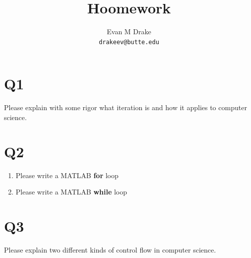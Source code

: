 \documentclass[12pt]{article}
\title{Hoomework}
\author{
	Evan M Drake \\
	\texttt{drakeev@butte.edu}
}
\begin{document}
	\maketitle


	\section*{Q1}
		Please explain with some rigor what iteration is and how it applies to computer science.

	\section*{Q2}
		\begin{enumerate}
			\item Please write a MATLAB \textbf{for} loop
			\item Please write a MATLAB \textbf{while} loop
		\end{enumerate}

	\section*{Q3}
		Please explain two different kinds of control flow in computer science.


	\nocite{*}

	\backmatter
\end{document}
